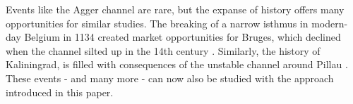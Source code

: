 \documentclass[11pt]{article}
\begin{document}
Events like the Agger channel are rare, but the expanse of history offers many opportunities for similar studies. The breaking of a narrow isthmus in modern-day Belgium in 1134 created market opportunities for Bruges, which declined when the channel silted up in the 14th century \citep{Houtte1966, Charlier2011}. Similarly, the history of Kaliningrad, is filled with consequences of the unstable channel around Pillau \citep{Britannica2018}. These events - and many more - can now also be studied with the approach introduced in this paper. 

\newpage



\newpage

\end{document}
